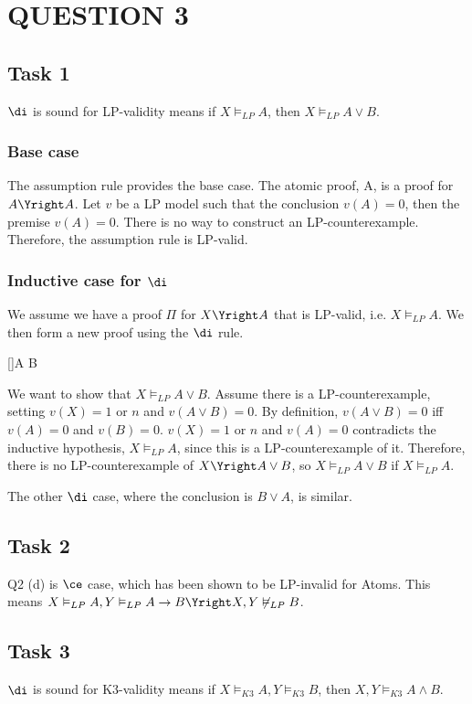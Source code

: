 \section*{QUESTION 3}

\subsection*{Task 1}
$\di$ is sound for LP-validity means if $X \vDash_{LP} A$, then $X \vDash_{LP} A \lor B$.

\subsubsection*{Base case}
The assumption rule provides the base case. The atomic proof, A, is a proof for $A \Yright A$. Let $v$ be a LP model such that the conclusion $v(A) = 0$, then the premise $v(A) = 0$. There is no way to construct an LP-counterexample. Therefore, the assumption rule is LP-valid.

\subsubsection*{Inductive case for $\di$}
We assume we have a proof $\Pi$ for $X \Yright A$ that is LP-valid, i.e. $X \vDash_{LP} A$. We then form a new proof using the $\di$ rule.
\begin{prooftree*}
[\di]{A \lor B}
\end{prooftree*}
We want to show that $X \vDash_{LP} A \lor B$. Assume there is a LP-counterexample, setting $v(X) = 1$ or $n$ and $v(A \lor B) = 0$. By definition, $v(A \lor B) = 0$ iff $v(A) = 0$ and $v(B) = 0$. $v(X) = 1$ or $n$ and $v(A) = 0$ contradicts the inductive hypothesis, $X \vDash_{LP} A$, since this is a LP-counterexample of it. Therefore, there is no LP-counterexample of $X \Yright A \lor B$, so $X \vDash_{LP} A \lor B$ if $X \vDash_{LP} A$.

The other $\di$ case, where the conclusion is $B \lor A$, is similar.

\subsection*{Task 2}
Q2 (d) is $\ce$ case, which has been shown to be LP-invalid for Atoms. This means $X \vDash_{LP} A, Y \vDash_{LP} A \to B \Yright X,Y \not\vDash_{LP} B$.

\subsection*{Task 3}
$\di$ is sound for K3-validity means if $X \vDash_{K3} A, Y \vDash_{K3} B$, then $X,Y \vDash_{K3} A \land B$.

